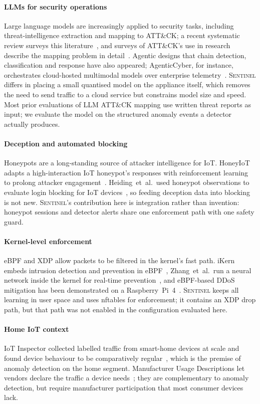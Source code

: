 \paragraph{LLMs for security operations}
Large language models are increasingly applied to security tasks, including
threat-intelligence extraction and mapping to ATT\&CK; a recent systematic
review surveys this literature~\cite{xu2025llmsec}, and surveys of ATT\&CK's
use in research describe the mapping problem in
detail~\cite{roy2023sok,alsada2023attack}. Agentic designs that chain
detection, classification and response have also appeared; AgenticCyber, for
instance, orchestrates cloud-hosted multimodal models over enterprise
telemetry~\cite{roy2025agenticcyber}. \textsc{Sentinel} differs in placing a
small quantised model on the appliance itself, which removes the need to send
traffic to a cloud service but constrains model size and speed. Most prior
evaluations of LLM ATT\&CK mapping use written threat reports as input; we
evaluate the model on the structured anomaly events a detector actually
produces.

\paragraph{Deception and automated blocking}
Honeypots are a long-standing source of attacker intelligence for IoT.
HoneyIoT adapts a high-interaction IoT honeypot's responses with
reinforcement learning to prolong attacker engagement~\cite{guan2023honeyiot}.
Heiding~et~al.\ used honeypot observations to evaluate login blocking for IoT
devices~\cite{heiding2020honeypot}, so feeding deception data into blocking is
not new. \textsc{Sentinel}'s contribution here is integration rather than
invention: honeypot sessions and detector alerts share one enforcement path
with one safety guard.

\paragraph{Kernel-level enforcement}
eBPF and XDP allow packets to be filtered in the kernel's fast path.
iKern embeds intrusion detection and prevention in eBPF~\cite{hadi2024ikern},
Zhang~et~al.\ run a neural network inside the kernel for real-time
prevention~\cite{zhang2024ebpf}, and eBPF-based DDoS mitigation has been
demonstrated on a Raspberry~Pi~4~\cite{tolay2025ebpf}. \textsc{Sentinel}
keeps all learning in user space and uses nftables for enforcement; it
contains an XDP drop path, but that path was not enabled in the configuration
evaluated here.

\paragraph{Home IoT context}
IoT Inspector collected labelled traffic from smart-home devices at scale and
found device behaviour to be comparatively regular~\cite{huang2020iotinspector},
which is the premise of anomaly detection on the home segment. Manufacturer
Usage Descriptions let vendors declare the traffic a device
needs~\cite{lear2019mud}; they are complementary to anomaly detection, but
require manufacturer participation that most consumer devices lack.
